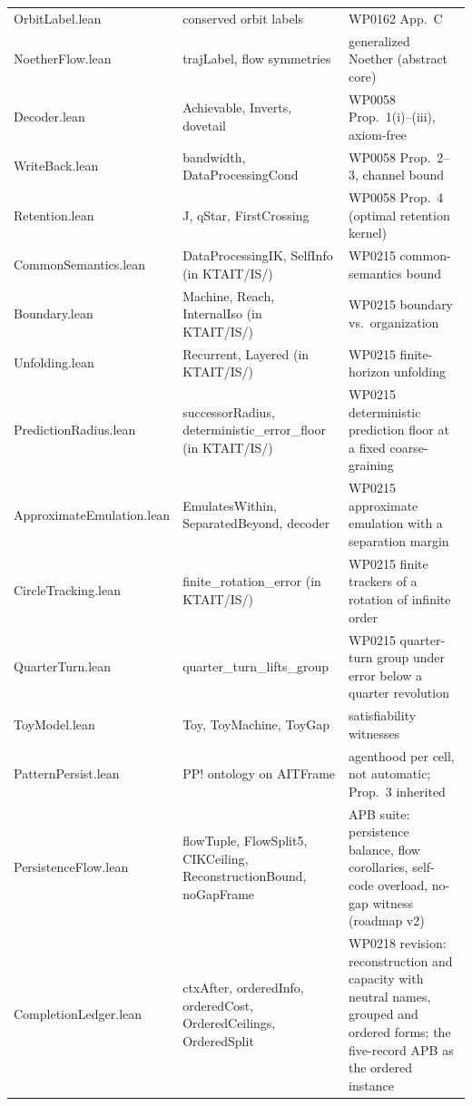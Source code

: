 \documentclass[11pt,a4paper]{article}
\newcommand{\lean}[1]{{\ttfamily\small
  \let\leanunderscore\_\def\_{\leanunderscore\allowbreak}#1}}
\begin{document}
{\begin{longtable}{@{}p{4.4cm}p{5.0cm}p{5.0cm}@{}}
\lean{OrbitLabel.lean} & conserved orbit labels & WP0162 App.~C \\
\lean{NoetherFlow.lean} & \lean{trajLabel}, flow symmetries & generalized Noether (abstract core) \\
\lean{Decoder.lean} & \lean{Achievable}, \lean{Inverts}, \lean{dovetail} & WP0058 Prop.~1(i)--(iii), axiom-free \\
\lean{WriteBack.lean} & \lean{bandwidth}, \lean{DataProcessingCond} & WP0058 Prop.~2--3, channel bound \\
\lean{Retention.lean} & \lean{J}, \lean{qStar}, \lean{FirstCrossing} & WP0058 Prop.~4 (optimal retention kernel) \\
\lean{CommonSemantics.lean} & \lean{DataProcessingIK}, \lean{SelfInfo} (in \lean{KTAIT/IS/}) & WP0215 common-semantics bound \\
\lean{Boundary.lean} & \lean{Machine}, \lean{Reach}, \lean{InternalIso} (in \lean{KTAIT/IS/}) & WP0215 boundary vs.\ organization \\
\lean{Unfolding.lean} & \lean{Recurrent}, \lean{Layered} (in \lean{KTAIT/IS/}) & WP0215 finite-horizon unfolding \\
\lean{PredictionRadius.lean} & \lean{successorRadius}, \lean{deterministic\_error\_floor} (in \lean{KTAIT/IS/}) & WP0215 deterministic prediction floor at a fixed coarse-graining \\
\lean{ApproximateEmulation.lean} & \lean{EmulatesWithin}, \lean{SeparatedBeyond}, \lean{decoder} & WP0215 approximate emulation with a separation margin \\
\lean{CircleTracking.lean} & \lean{finite\_rotation\_error} (in \lean{KTAIT/IS/}) & WP0215 finite trackers of a rotation of infinite order \\
\lean{QuarterTurn.lean} & \lean{quarter\_turn\_lifts\_group} & WP0215 quarter-turn group under error below a quarter revolution \\
\lean{ToyModel.lean} & \lean{Toy}, \lean{ToyMachine}, \lean{ToyGap} & satisfiability witnesses \\
\lean{PatternPersist.lean} & PP! ontology on \lean{AITFrame} & agenthood per cell, not automatic; Prop.~3 inherited \\
\lean{PersistenceFlow.lean} & \lean{flowTuple}, \lean{FlowSplit5}, \lean{CIKCeiling}, \lean{ReconstructionBound}, \lean{noGapFrame} & APB suite: persistence balance, flow corollaries, self-code overload, no-gap witness (roadmap v2) \\
\lean{CompletionLedger.lean} & \lean{ctxAfter}, \lean{orderedInfo}, \lean{orderedCost}, \lean{OrderedCeilings}, \lean{OrderedSplit} & WP0218 revision: reconstruction and capacity with neutral names, grouped and ordered forms; the five-record APB as the ordered instance \\

\end{longtable}}
\end{document}
